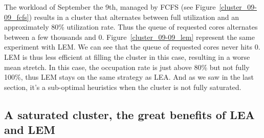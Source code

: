 \documentclass[conference,10pt]{IEEEtran}
\begin{document}
The workload of September the 9th, managed by FCFS (see Figure~\ref{cluster_09-09_fcfs}) results in a cluster that alternates between full utilization and an approximately 80\% utilization rate. Thus the queue of requested cores alternates between a few thousands and 0.
Figure~\ref{cluster_09-09_lem} represent the same experiment with LEM. We can see that the queue of requested cores never hits 0. LEM is thus less efficient at filling the cluster in this case, resulting in a worse mean stretch.
In this case, the occupation rate is just above 80\% but not fully 100\%, thus LEM stays on the same strategy as LEA. And as we saw in the last section, it's a sub-optimal heuristics when the cluster is not fully saturated.

\subsection{A saturated cluster, the great benefits of LEA and LEM}
\end{document}
